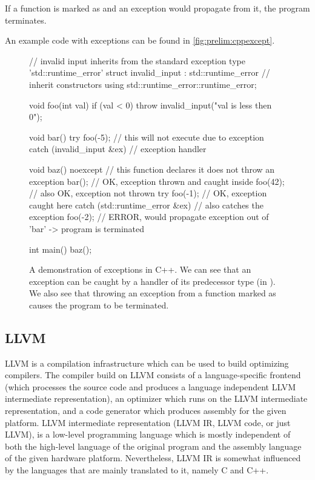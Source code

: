 If a function is marked as  and an exception would propagate from
it, the program terminates.

An example code with exceptions can be found in \autoref{fig:prelim:cppexcept}.

\begin{figure}[tp]
    \begin{cppcode}
        // invalid input inherits from the standard exception type 'std::runtime_error'
        struct invalid_input : std::runtime_error {
            // inherit constructors
            using std::runtime_error::runtime_error;
        }

        void foo(int val) {
            if (val < 0)
                throw invalid_input("val is less then 0");
        }

        void bar() {
            try {
                foo(-5);
                // this will not execute due to exception
            } catch (invalid_input &ex) {
                // exception handler
            }
        }

        void baz() noexcept { // this function declares it does not throw an exception
            bar(); // OK, exception thrown and caught inside
            foo(42); // also OK, exception not thrown
            try {
                foo(-1); // OK, exception caught here
            } catch (std::runtime_error &ex) {
                // also catches the exception
            }
            foo(-2); // ERROR, would propagate exception out of 'bar' -> program is terminated
        }

        int main() { baz(); }
    \end{cppcode}
    \caption{A demonstration of exceptions in C++.
    We can see that an exception can be caught by a  handler of its
    predecessor type (in ).
    We also see that throwing an exception from a function marked as
     causes the program to be terminated.
    }\label{fig:prelim:cppexcept}
\end{figure}


\subsection{LLVM} %

LLVM is a compilation infrastructure which can be used to build optimizing
compilers.
The compiler build on LLVM consists of a language-specific frontend (which
processes the source code and produces a language independent LLVM intermediate
representation), an optimizer which runs on the LLVM intermediate
representation, and a code generator which produces assembly for the given
platform.
LLVM intermediate representation (LLVM IR, LLVM code, or just LLVM), is a
low-level programming language which is mostly independent of both the
high-level language of the original program and the assembly language of the
given hardware platform.
Nevertheless, LLVM IR is somewhat influenced by the languages that are mainly
translated to it, namely C and C++.

